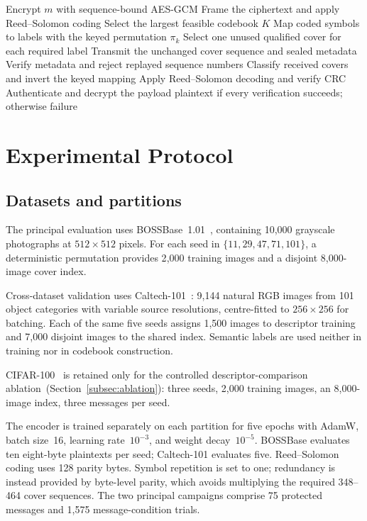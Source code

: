 ﻿\documentclass[10pt,journal]{IEEEtran}
\newcommand{\method}{NARCIS\xspace}
\begin{document}
\begin{algorithm}[t]
\caption{\method protected coverless transmission}
\label{alg:narcis}
Encrypt $m$ with sequence-bound AES-GCM\;
Frame the ciphertext and apply Reed--Solomon coding\;
Select the largest feasible codebook $K$\;
Map coded symbols to labels with the keyed permutation $\pi_k$\;
Select one unused qualified cover for each required label\;
Transmit the unchanged cover sequence and sealed metadata\;
Verify metadata and reject replayed sequence numbers\;
Classify received covers and invert the keyed mapping\;
Apply Reed--Solomon decoding and verify CRC\;
Authenticate and decrypt the payload\;
\Return plaintext if every verification succeeds; otherwise failure\;
\end{algorithm}

\section{Experimental Protocol}
\label{sec:experiments}

\subsection{Datasets and partitions}
\label{subsec:datasets}

The principal evaluation uses BOSSBase~1.01~\cite{bas2011boss},
containing 10{,}000 grayscale photographs at $512\times512$ pixels.
For each seed in $\{11,29,47,71,101\}$, a deterministic permutation
provides 2{,}000 training images and a disjoint 8{,}000-image cover
index.

Cross-dataset validation uses Caltech-101~\cite{fei2004caltech}:
9{,}144 natural RGB images from 101 object categories with variable
source resolutions, centre-fitted to $256\times256$ for batching. Each
of the same five seeds assigns 1{,}500 images to descriptor training
and 7{,}000 disjoint images to the shared index. Semantic labels are
used neither in training nor in codebook construction.

CIFAR-100~\cite{krizhevsky2009cifar} is retained only for the
controlled descriptor-comparison ablation~(Section~\ref{subsec:ablation}):
three seeds, 2{,}000 training images, an 8{,}000-image index, three
messages per seed.

The encoder is trained separately on each partition for five epochs
with AdamW, batch size~16, learning rate~$10^{-3}$, and weight
decay~$10^{-5}$. BOSSBase evaluates ten eight-byte plaintexts per
seed; Caltech-101 evaluates five. Reed--Solomon coding uses 128 parity
bytes. Symbol repetition is set to one; redundancy is instead provided
by byte-level parity, which avoids multiplying the required 348--464
cover sequences. The two principal campaigns comprise 75 protected
messages and 1{,}575 message-condition trials.
\end{document}
